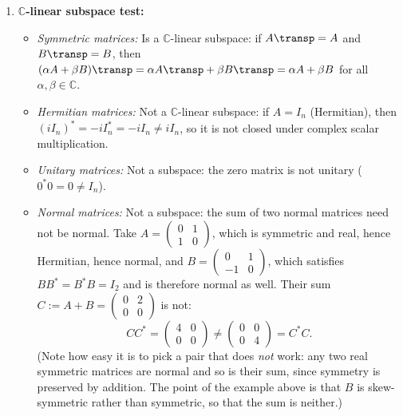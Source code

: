 \begin{exercisesolution*}
\begin{enumerate}[label=\textbf{(\alph*)}]
    \item \textbf{$\mathbb{C}$-linear subspace test:}
    \begin{itemize}
        \item \emph{Symmetric matrices:} Is a $\mathbb{C}$-linear subspace: if $A\transp = A$ and $B\transp = B$, then $(\alpha A + \beta B)\transp = \alpha A\transp + \beta B\transp = \alpha A + \beta B$ for all $\alpha, \beta \in \mathbb{C}$.
        \item \emph{Hermitian matrices:} Not a $\mathbb{C}$-linear subspace: if $A = I_n$ (Hermitian), then $(i I_n)^* = -i I_n^* = -i I_n \ne i I_n$, so it is not closed under complex scalar multiplication.
        \item \emph{Unitary matrices:} Not a subspace: the zero matrix is not unitary ($0^* 0 = 0 \ne I_n$).
        \item \emph{Normal matrices:} Not a subspace: the sum of two normal matrices need not be normal. Take $A = \left(\begin{smallmatrix} 0 & 1 \\ 1 & 0 \end{smallmatrix}\right)$, which is symmetric and real, hence Hermitian, hence normal, and $B = \left(\begin{smallmatrix} 0 & 1 \\ -1 & 0 \end{smallmatrix}\right)$, which satisfies $B B^* = B^* B = I_2$ and is therefore normal as well. Their sum $C := A + B = \left(\begin{smallmatrix} 0 & 2 \\ 0 & 0 \end{smallmatrix}\right)$ is not:
        \[
        C C^* = \begin{pmatrix} 4 & 0 \\ 0 & 0 \end{pmatrix} \ne \begin{pmatrix} 0 & 0 \\ 0 & 4 \end{pmatrix} = C^* C.
        \]
        (Note how easy it is to pick a pair that does \emph{not} work: any two real symmetric matrices are normal and so is their sum, since symmetry is preserved by addition. The point of the example above is that $B$ is skew-symmetric rather than symmetric, so that the sum is neither.)
    \end{itemize}


\end{enumerate}
\end{exercisesolution*}
